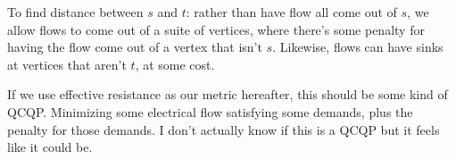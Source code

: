 To find distance between $s$ and $t$: rather than have flow all
come out of $s$, we allow
flows to come out of a suite of vertices, where there's some
penalty for having the flow come out of a vertex that isn't $s$.
Likewise, flows can have sinks at vertices that aren't $t$, at
some cost.

If we use effective resistance as our metric hereafter, this
should be some kind of QCQP. Minimizing some electrical flow
satisfying some demands, plus the penalty for those demands. I
don't actually know if this is a QCQP but it feels like it could
be.
